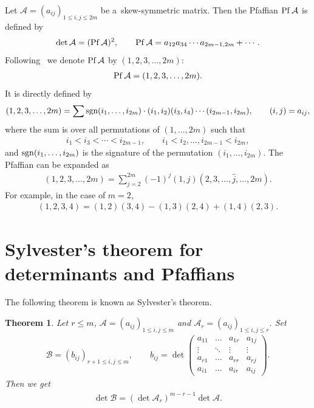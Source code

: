 \documentclass[11pt]{article}
\newtheorem{theorem}{Theorem}
\begin{document}
Let ${\mathcal A} =(a_{ij})_{1\le i,j\le2m}$ be a~skew-symmetric matrix.
Then the Pfaf\/f\/ian ${\rm Pf}\, {\mathcal A}$ is def\/ined by
\begin{gather*}
\det{\mathcal A}=({\rm Pf}\,{\mathcal A})^2,\qquad {\rm Pf}\,{\mathcal A}=a_{12}a_{34}\cdots a_{2m-1,2m}+\cdots.
\end{gather*}
Following~\cite{H1} we denote ${\rm Pf}\, {\mathcal A}$ by $(1,2,3,\dots,2m)$:
\begin{gather*}
{\rm Pf}\,{\mathcal A}=(1,2,3,\dots,2m).
\end{gather*}
It is directly def\/ined by
\begin{gather*}
(1,2,3,\dots,2m)=\sum{\rm sgn}(i_1,\dots,i_{2m})\cdot(i_1,i_2)(i_3,i_4)\cdots(i_{2m-1},i_{2m}
),\qquad (i,j)=a_{ij},
\end{gather*}
where the sum is over all permutations of $(1,\dots,2m)$ such that
\begin{gather*}
i_1<i_3<\cdots<i_{2m-1},\qquad i_1<i_2,\dots,i_{2m-1}<i_{2m},
\end{gather*}
and ${\rm sgn}(i_1,\dots,i_{2m})$ is the signature of the permutation $(i_1,\dots,i_{2m})$.
The Pfaf\/f\/ian can be expanded as
\begin{gather*}
(1,2,3,\dots,2m)=\sum_{j=2}^{2m}(-1)^j(1,j)(2,3,\dots,\hat{j},\dots,2m).
\end{gather*}
For example, in the case of $m=2$,
\begin{gather*}
(1,2,3,4)=(1,2)(3,4)-(1,3)(2,4)+(1,4)(2,3).
\end{gather*}

\section{Sylvester's theorem for determinants and Pfaf\/f\/ians} \label{appendixB}

The following theorem is known as
Sylvester's theorem.
\begin{theorem}\label{theorem4}
Let $r\le m$, ${\mathcal A}=(a_{ij})_{1\le i,j\le m}$ and ${\mathcal A}_r=(a_{ij})_{1\le i,j\le r}$.
Set
\begin{gather*}
{\mathcal B}=(b_{ij})_{r+1\le i,j\le m},
\qquad
b_{ij}=\det\left(
\begin{matrix}a_{11}&\hdots&a_{1r}&a_{1j}
\\
\vdots&\ddots&\vdots&\vdots
\\
a_{r1}&\hdots&a_{rr}&a_{rj}
\\
a_{i1}&\hdots&a_{ir}&a_{ij}
\end{matrix}
\right).
\end{gather*}
Then we get
\begin{gather*}%
\det{\mathcal B}=(\det{\mathcal A}_r)^{m-r-1}\det{\mathcal A}.
\end{gather*}
\end{theorem}
\end{document}
